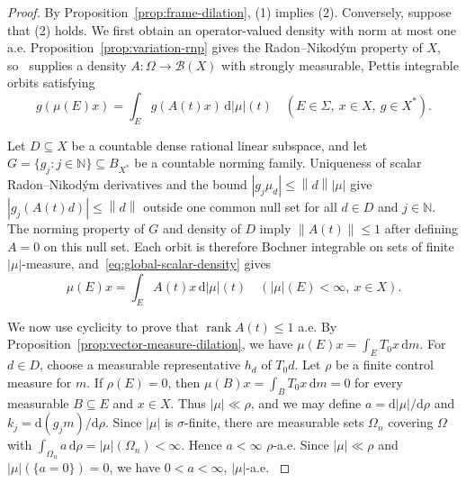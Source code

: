 \documentclass[11pt,leqno]{amsart}
\theoremstyle{compact}
\numberwithin{equation}{section}
\theoremstyle{compactremark}
\theoremstyle{compact}
\newcommand{\1}{\mathbbm{1}}
\newcommand{\rmd}{\mathrm{d}}
\newcommand{\N}{\mathbb{N}}
\newcommand{\cB}{\mathcal{B}}
\newcommand{\norm}[1]{\left\|#1\right\|}
\newcommand{\abs}[1]{\left|#1\right|}
\begin{document}
\begin{proof}
By Proposition~\ref{prop:frame-dilation}, (1) implies (2). Conversely, suppose that (2) holds. We first obtain an operator-valued density with norm at most one a.e. Proposition~\ref{prop:variation-rnp} gives the Radon--Nikod\'ym property of $X$, so~\cite[Theorem~2.6]{LiLi2017} supplies a density $A:\Omega\to\cB(X)$ with strongly measurable, Pettis integrable orbits satisfying
\begin{equation}\label{eq:global-scalar-density}
g(\mu(E)x)=\int_Eg(A(t)x)\,\rmd\abs{\mu}(t)\quad(E\in\Sigma,\ x\in X,\ g\in X^*).
\end{equation}

Let $D\subseteq X$ be a countable dense rational linear subspace, and let $G=\{g_j:j\in\N\}\subseteq B_{X^*}$ be a countable norming family. Uniqueness of scalar Radon--Nikod\'ym derivatives and the bound $\abs{g_j\mu_d}\leq\norm{d}\abs{\mu}$ give $\abs{g_j(A(t)d)}\leq\norm{d}$ outside one common null set for all $d\in D$ and $j\in\N$. The norming property of $G$ and density of $D$ imply $\norm{A(t)}\leq1$ after defining $A=0$ on this null set. Each orbit is therefore Bochner integrable on sets of finite $\abs{\mu}$-measure, and~\eqref{eq:global-scalar-density} gives
\begin{equation}\label{eq:local-operator-density}
\mu(E)x=\int_EA(t)x\,\rmd\abs{\mu}(t)\quad(\abs{\mu}(E)<\infty,\ x\in X).
\end{equation}

We now use cyclicity to prove that $\operatorname{rank}A(t)\leq1$ a.e. By Proposition~\ref{prop:vector-measure-dilation}, we have $\mu(E)x=\int_ET_0x\,\rmd m$. For $d\in D$, choose a measurable representative $h_d$ of $T_0d$.
\begingroup
Let $\rho$ be a finite control measure for $m$. If $\rho(E)=0$, then $\mu(B)x=\int_BT_0x\,\rmd m=0$ for every measurable $B\subseteq E$ and $x\in X$. Thus $\abs{\mu}\ll\rho$, and we may define $a=\rmd\abs{\mu}/\rmd\rho$ and $k_j=\rmd(g_jm)/\rmd\rho$. Since $\abs{\mu}$ is $\sigma$-finite, there are measurable sets $\Omega_n$ covering $\Omega$ with $ \int_{\Omega_n}a\,\rmd\rho=\abs{\mu}(\Omega_n)<\infty$. Hence $a<\infty$ $\rho$-a.e. Since $\abs{\mu}\ll\rho$ and $\abs{\mu}(\{a=0\})=0$, we have $0<a<\infty$, $\abs{\mu}$-a.e.
\endgroup


\end{proof}
\end{document}
